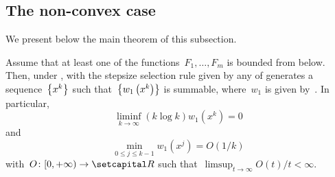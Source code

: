 \documentclass[../../main]{subfiles}
\begin{document}
\subsection{The non-convex case}
We present below the main theorem of this subsection.
\begin{theorem} 
    Assume that at least one of the functions~$F_1, \dots, F_m$ is bounded from below.
    Then, under ,  with the stepsize selection rule given by any of  generates a sequence~$\set*{x^k}$ such that~$\set*{w_1\left(x^k\right)}$ is summable, where~$w_1$ is given by~.
    In particular,
    \begin{equation}
        \liminf_{k \to \infty} (k \log k) w_1\left(x^k\right) = 0
    \end{equation}
    and
    \begin{equation}
        \min_{0 \le j \le k - 1} w_1\left(x^j\right) = O(1 / k)
    \end{equation}
    with~$O \colon [0, + \infty) \to \setR$ such that~$\limsup_{t \to \infty} O(t) / t < \infty$.
\end{theorem}
\end{document}
